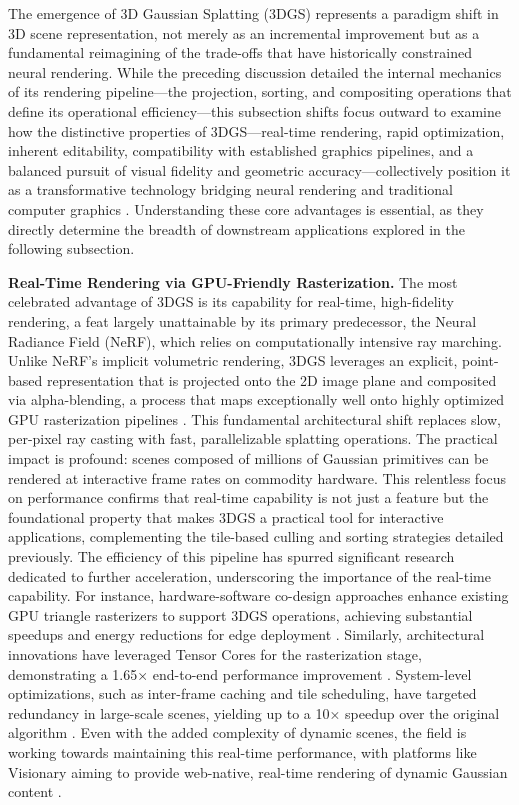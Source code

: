\documentclass[11pt]{article}
\begin{document}
The emergence of 3D Gaussian Splatting (3DGS) represents a paradigm shift in 3D scene representation, not merely as an incremental improvement but as a fundamental reimagining of the trade-offs that have historically constrained neural rendering. While the preceding discussion detailed the internal mechanics of its rendering pipeline---the projection, sorting, and compositing operations that define its operational efficiency---this subsection shifts focus outward to examine how the distinctive properties of 3DGS---real-time rendering, rapid optimization, inherent editability, compatibility with established graphics pipelines, and a balanced pursuit of visual fidelity and geometric accuracy---collectively position it as a transformative technology bridging neural rendering and traditional computer graphics \cite{ref5,ref2}. Understanding these core advantages is essential, as they directly determine the breadth of downstream applications explored in the following subsection.

\textbf{Real-Time Rendering via GPU-Friendly Rasterization.} The most celebrated advantage of 3DGS is its capability for real-time, high-fidelity rendering, a feat largely unattainable by its primary predecessor, the Neural Radiance Field (NeRF), which relies on computationally intensive ray marching. Unlike NeRF's implicit volumetric rendering, 3DGS leverages an explicit, point-based representation that is projected onto the 2D image plane and composited via alpha-blending, a process that maps exceptionally well onto highly optimized GPU rasterization pipelines \cite{ref37}. This fundamental architectural shift replaces slow, per-pixel ray casting with fast, parallelizable splatting operations. The practical impact is profound: scenes composed of millions of Gaussian primitives can be rendered at interactive frame rates on commodity hardware. This relentless focus on performance confirms that real-time capability is not just a feature but the foundational property that makes 3DGS a practical tool for interactive applications, complementing the tile-based culling and sorting strategies detailed previously. The efficiency of this pipeline has spurred significant research dedicated to further acceleration, underscoring the importance of the real-time capability. For instance, hardware-software co-design approaches enhance existing GPU triangle rasterizers to support 3DGS operations, achieving substantial speedups and energy reductions for edge deployment \cite{ref38}. Similarly, architectural innovations have leveraged Tensor Cores for the rasterization stage, demonstrating a 1.65× end-to-end performance improvement \cite{ref39}. System-level optimizations, such as inter-frame caching and tile scheduling, have targeted redundancy in large-scale scenes, yielding up to a 10× speedup over the original algorithm \cite{ref40}. Even with the added complexity of dynamic scenes, the field is working towards maintaining this real-time performance, with platforms like Visionary aiming to provide web-native, real-time rendering of dynamic Gaussian content \cite{ref41}.
\end{document}

